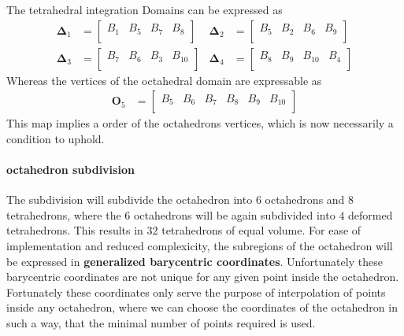\documentclass{mitschrift}
\newcommand{\simplex}{\boldsymbol{\Delta}}
\begin{document}
The tetrahedral integration Domains can be expressed as \begin{align}
    \simplex_1 &= \begin{bmatrix}
        B_1 & B_5 & B_7 & B_8 \\
    \end{bmatrix} & \simplex_2 &= \begin{bmatrix}
        B_5 & B_2 & B_6 & B_9 \\
    \end{bmatrix} \\
    \simplex_3 &= \begin{bmatrix}
        B_7 & B_6 & B_3 & B_{10} \\
    \end{bmatrix} & \simplex_4 &= \begin{bmatrix}
        B_8 & B_9 & B_{10} & B_4 \\
    \end{bmatrix}
\end{align}
Whereas the vertices of the octahedral domain are expressable as \begin{align}
    \mathbf{O}_5 &= \begin{bmatrix}
        B_{5} & B_6 & B_7 & B_{8} & B_9 & B_{10} \\
    \end{bmatrix}
\end{align}
This map implies a order of the octahedrons vertices, which is now necessarily a condition to uphold.

\paragraph{octahedron subdivision}

The subdivision will subdivide the octahedron into $6$ octahedrons and $8$ tetrahedrons, where the $6$ octahedrons will be 
again subdivided into $4$ deformed tetrahedrons. This results in $32$ tetrahedrons of equal volume.
For ease of implementation and reduced complexicity, the subregions of the octahedron will be expressed in \textbf{generalized barycentric coordinates}.
Unfortunately these barycentric coordinates are not unique for any given point inside the octahedron.
Fortunately these coordinates only serve the purpose of interpolation of points inside any octahedron, where we can choose the coordinates of the octahedron
in such a way, that the minimal number of points required is used.
\end{document}
